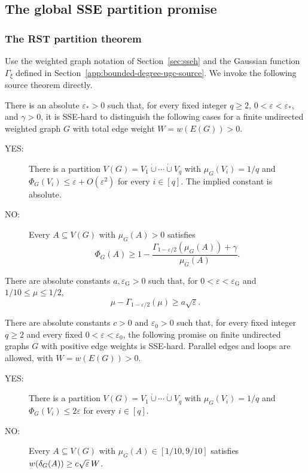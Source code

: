 \subsection{The global SSE partition promise}
\label{app:sse-normalization}

\subsubsection{The RST partition theorem}

Use the weighted graph notation of Section~\ref{sec:sseh} and the
Gaussian function $\Gamma_\xi$ defined in
Section~\ref{app:bounded-degree-ugc-source}. We invoke the following
source theorem directly.

\begin{theorem}
\label{thm:rst-partition}
There is an absolute $\varepsilon_*>0$ such that, for every fixed
integer $q\geq2$, $0<\varepsilon<\varepsilon_*$, and $\gamma>0$,
it is SSE-hard to distinguish the following cases for a finite
undirected weighted graph $G$ with total edge weight $W=w(E(G))>0$.
\begin{description}
\item[YES:] There is a partition
 $V(G)=V_1\mathbin{\dot\cup}\cdots\mathbin{\dot\cup}V_q$ with
 $\mu_G(V_i)=1/q$ and
 $\Phi_G(V_i)\leq\varepsilon+O(\varepsilon^2)$ for every $i\in[q]$.
 The implied constant is absolute.
\item[NO:] Every $A\subseteq V(G)$ with $\mu_G(A)>0$ satisfies
 \[
  \Phi_G(A)\geq
  1-\frac{\Gamma_{1-\varepsilon/2}(\mu_G(A))+\gamma}{\mu_G(A)}.
 \]
\end{description}
\end{theorem}

\begin{lemma}
\label{lem:gaussian-medium-separation}
There are absolute constants $a,\varepsilon_{\mathrm G}>0$ such that,
for $0<\varepsilon<\varepsilon_{\mathrm G}$ and
$1/10\leq\mu\leq1/2$,
\[
 \mu-\Gamma_{1-\varepsilon/2}(\mu)\geq a\sqrt\varepsilon.
\]
\end{lemma}

\begin{theorem}
\label{thm:sse-source}
There are absolute constants $c>0$ and $\varepsilon_0>0$ such that,
for every fixed integer $q\geq2$ and every fixed
$0<\varepsilon<\varepsilon_0$, the following promise on finite
undirected graphs $G$ with positive edge weights is SSE-hard.
Parallel edges and loops are allowed, with $W=w(E(G))>0$.
\begin{description}
\item[YES:] There is a partition
  $V(G)=V_1\mathbin{\dot\cup}\cdots\mathbin{\dot\cup}V_q$ with
  $\mu_G(V_i)=1/q$ and $\Phi_G(V_i)\leq2\varepsilon$ for every $i\in[q]$.
\item[NO:] Every $A\subseteq V(G)$ with
  $\mu_G(A)\in[1/10,9/10]$ satisfies
  $w(\delta_G(A))\geq c\sqrt{\varepsilon}\,W$.
\end{description}
\end{theorem}

